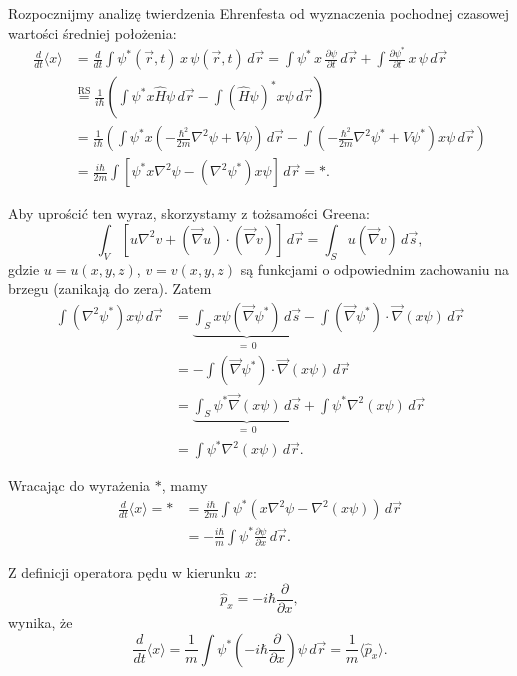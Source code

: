Rozpocznijmy analizę twierdzenia Ehrenfesta od wyznaczenia pochodnej czasowej wartości średniej położenia:
\begin{align*}
\frac{d}{dt} \langle x \rangle &= \frac{d}{dt} \int \psi^*(\vec{r},t) \, x \, \psi(\vec{r},t) \, d\vec{r} = \int \psi^* \, x \, \frac{\partial \psi}{\partial t} \, d\vec{r} + \int \frac{\partial \psi^*}{\partial t} \, x \, \psi \, d\vec{r} \\
&\overset{\text{RS}}{=}\frac{1}{i\hbar} \left( \int \psi^* x \hat{H} \psi \, d\vec{r} - \int (\hat{H} \psi)^* x \psi \, d\vec{r} \right) \\
&= \frac{1}{i\hbar} \left( \int \psi^* x \left( -\frac{\hbar^2}{2m} \nabla^2 \psi + V \psi \right)\, d\vec{r} - \int \left( -\frac{\hbar^2}{2m} \nabla^2 \psi^* + V \psi^* \right) x \psi \, d\vec{r} \right) \\
&= \frac{i\hbar}{2m} \int \left[ \psi^* x \nabla^2 \psi - (\nabla^2 \psi^*) x \psi \right]\, d\vec{r} = *.
\end{align*}

Aby uprościć ten wyraz, skorzystamy z tożsamości Greena:
$$
\int_V \left[ u \nabla^2 v + (\vec{\nabla} u) \cdot (\vec{\nabla} v) \right]\, d\vec{r} = \int_S u (\vec{\nabla} v) \, d\vec{s},
$$
gdzie $u = u(x,y,z)$, $v = v(x,y,z)$ są funkcjami o odpowiednim zachowaniu na brzegu (zanikają do zera). Zatem
\begin{align*}
\int (\nabla^2 \psi^*) x \psi \, d\vec{r} &= \underbrace{\int_S x \psi (\vec{\nabla} \psi^*) \, d\vec{s}}_{=\,0} - \int (\vec{\nabla} \psi^*) \cdot \vec{\nabla}(x \psi) \, d\vec{r} \\
&= - \int (\vec{\nabla} \psi^*) \cdot \vec{\nabla}(x \psi) \, d\vec{r} \\
&= \underbrace{\int_S \psi^* \vec{\nabla}(x \psi) \, d\vec{s}}_{=\,0} + \int \psi^* \nabla^2 (x \psi) \, d\vec{r} \\
&= \int \psi^* \nabla^2 (x \psi) \, d\vec{r}.
\end{align*}

Wracając do wyrażenia $*$, mamy
\begin{align*}
\frac{d}{dt} \langle x \rangle = * &= \frac{i\hbar}{2m} \int \psi^* \left( x \nabla^2 \psi - \nabla^2 (x \psi) \right)\, d\vec{r} \\
&= -\frac{i\hbar}{m} \int \psi^* \frac{\partial \psi}{\partial x} \, d\vec{r}.
\end{align*}

Z definicji operatora pędu w kierunku $x$:
$$
\hat{p}_x = -i\hbar \frac{\partial}{\partial x},
$$
wynika, że
$$
\frac{d}{dt} \langle x \rangle = \frac{1}{m} \int \psi^* \left(-i\hbar \frac{\partial}{\partial x}\right) \psi \, d\vec{r} = \frac{1}{m} \langle \hat{p}_x \rangle.
$$

